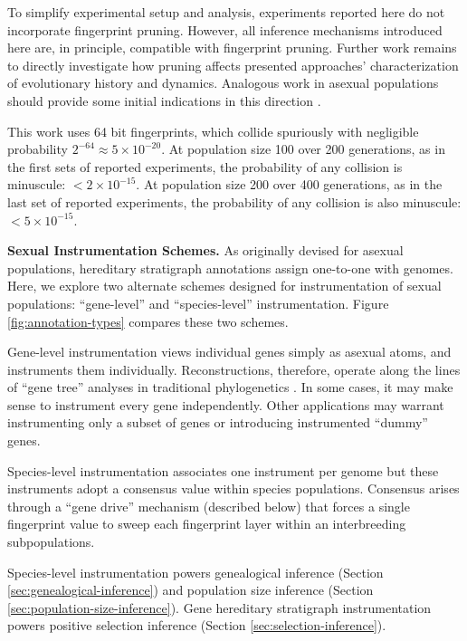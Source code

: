 To simplify experimental setup and analysis, experiments reported here do not incorporate fingerprint pruning.
However, all inference mechanisms introduced here are, in principle, compatible with fingerprint pruning.
Further work remains to directly investigate how pruning affects presented approaches' characterization of evolutionary history and dynamics.
Analogous work in asexual populations should provide some initial indications in this direction \citep{moreno2023toward}.

This work uses 64 bit fingerprints, which collide spuriously with negligible probability $2^{-64} \approx 5 \times 10^{-20}$.
At population size 100 over 200 generations, as in the first sets of reported experiments, the probability of any collision is minuscule: $< 2 \times 10^{-15}$.
At population size 200 over 400 generations, as in the last set of reported experiments, the probability of any collision is also minuscule: $< 5 \times 10^{-15}$.


\textbf{Sexual Instrumentation Schemes.}
As originally devised for asexual populations, hereditary stratigraph annotations assign one-to-one with genomes.
Here, we explore two alternate schemes designed for instrumentation of sexual populations: ``gene-level'' and ``species-level'' instrumentation.
Figure \ref{fig:annotation-types} compares these two schemes.

Gene-level instrumentation views individual genes simply as asexual atoms, and instruments them individually.
Reconstructions, therefore, operate along the lines of ``gene tree'' analyses in traditional phylogenetics \citep{avise1989gene}.
In some cases, it may make sense to instrument every gene independently.
Other applications may warrant instrumenting only a subset of genes or introducing instrumented ``dummy'' genes.

Species-level instrumentation associates one instrument per genome but these instruments adopt a consensus value within species populations.
Consensus arises through a ``gene drive'' mechanism (described below) that forces a single fingerprint value to sweep each fingerprint layer within an interbreeding subpopulations.

Species-level instrumentation powers genealogical inference (Section \ref{sec:genealogical-inference}) and population size inference (Section \ref{sec:population-size-inference}).
Gene hereditary stratigraph instrumentation powers positive selection inference (Section \ref{sec:selection-inference}).

